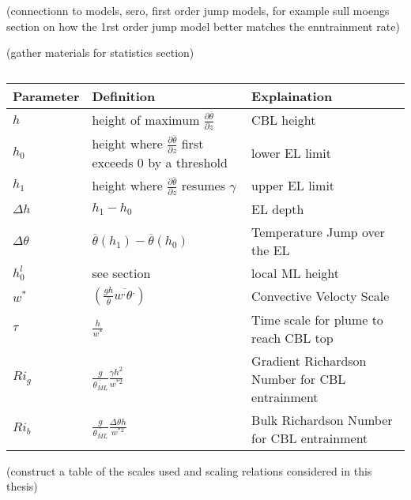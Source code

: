 (connectionn to models, sero, first order jump models, for example sull moengs section on how the 1rst order jump model
better matches the enntrainment rate)

(gather materials for statistics section)

\begin{table}[!ht]
    \begin{center}
    \begin{tabular}{ | l | p{5cm} | p{5cm} |}
    \hline
     Parameter & Definition & Explaination \\ \hline
     $h$&  height of maximum $\frac{\partial \overline{\theta}}{\partial z}$& \acs{CBL} height \\ \hline
     $h_{0}$& height where $\frac{\partial \overline{\theta}}{\partial z}$ first exceeds 0 by a threshold& lower \acs{EL} limit\\ \hline
     $h_{1}$& height where $\frac{\partial \overline{\theta}}{\partial z}$ resumes $\gamma$& upper \acs{EL} limit\\ \hline
     $\Delta h$& $h_{1} - h_{0}$ & \acs{EL} depth\\ \hline
     $\Delta \theta$ & $\overline{\theta}(h_{1})-\overline{\theta}(h_{0})$ & Temperature Jump over the \acs{EL}\\ \hline
     $h^{l}_{0}$& see section \label{sec:BLMeas}  & local \acs{ML} height\\ \hline
     $w^{*}$ & $\left( \frac{gh}{\overline{\theta}}\overline{w^{,}\theta^{,}} \right)$ & Convective Velocty Scale\\ \hline
     $\tau$ & $\frac{h}{w^{*}}$ & Time scale for plume to reach \acs{CBL} top\\ \hline
     $Ri_{g}$ & $\frac{g}{\overline{\theta_{ML}}} \frac{\gamma h^{2} }{w^{*2}}$ & Gradient Richardson Number for \acs{CBL} entrainment \\ \hline
     $Ri_{b}$ & $\frac{g}{\overline{\theta_{ML}}} \frac{\Delta \theta h }{w^{*2}}$ & Bulk Richardson Number for \acs{CBL} entrainment \\ \hline

   
\end{tabular}
\caption{}
\label{fig:}   
\end{center}    
\end{table}

(construct a table of the scales used and scaling relations considered in this thesis)


\endinput

Any text after an \endinput is ignored.
You could put scraps here or things in progress.
